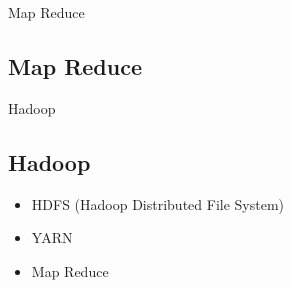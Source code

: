 \documentclass[11pt]{beamer}
\begin{document}
\begin{frame}{Map Reduce}
\subsection{Map Reduce}
\begin{figure}
\end{figure}
\end{frame}

\begin{frame}{Hadoop}
\subsection{Hadoop}
\begin{center}
\begin{figure}
\end{figure}
\end{center}
\begin{itemize}
	\item HDFS (Hadoop Distributed File System)
	\item YARN
	\item Map Reduce
\end{itemize}
\end{frame}
\end{document}
